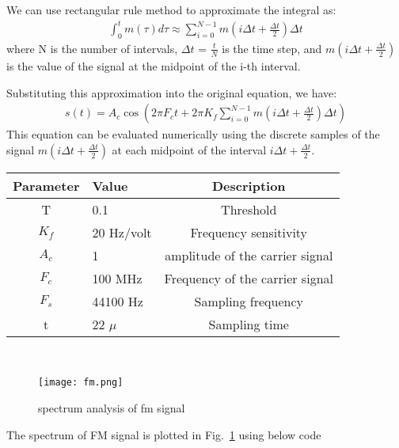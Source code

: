 \documentclass[journal,5pt,twocolumn]{IEEEtran}
\newcommand\figref{Fig.~\ref}
\begin{document}
\begin{enumerate}
 \fi
 
We can use rectangular rule method to approximate the integral as:
\begin{align}
\int_{0}^t m(\tau) d\tau \approx \sum_{i=0}^{N-1} m\left(i \Delta t + \frac{\Delta t}{2}\right) \Delta t
\end{align}
where N is the number of intervals, $\Delta t$ = $\frac{t}{N}$ is the time step, and $m\left(i \Delta t + \frac{\Delta t}{2}\right)$ is the value of the signal at the midpoint of the i-th interval.

Substituting this approximation into the original equation, we have:
\begin{align}
s(t) = A_c \cos \left(2 \pi F_c t +2\pi K_{f} \sum_{i=0}^{N-1} m\left(i \Delta t + \frac{\Delta t}{2}\right) \Delta t\right)
\end{align}
This equation can be evaluated numerically using the discrete samples of the signal $m\left(i \Delta t + \frac{\Delta t}{2}\right)$ at each midpoint of the interval $i\Delta t + \frac{\Delta t}{2}. $
 
 
 
 
    \begin{tabular}{|c|l|c|}
    \hline 
    \textbf{Parameter} & \textbf{Value} &\textbf{Description} \\ \hline
    T&0.1&Threshold\\
    $K_{f}$ & 20 Hz/volt & Frequency sensitivity \\ 
    $A_c$ & 1  & amplitude of the carrier signal\\ 
    $F_c $& 100 MHz & Frequency of the carrier signal\\ 
    $F_s$ & 44100 Hz & Sampling frequency\\ 
    t     & 22 $\mu$ & Sampling time\\  \hline
    \end{tabular}
    \\



       
\iffalse
 \begin{align*}
K_{f} = \frac{\Delta f}{A_m} 
 \end{align*}
 \fi
 \begin{figure}
\centering 
\texttt{[image: fm.png]} 
\caption{spectrum analysis of fm signal}
\label{fig:fm_spectrum}
\end{figure}

The spectrum of FM signal is plotted in \figref{fig:fm_spectrum} using below code
\begin{center}
\end{center}



\end{enumerate}
\end{document}
